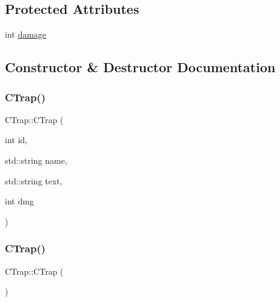 \subsection*{Protected Attributes}
\begin{DoxyCompactItemize}
\item 
int \mbox{\hyperlink{class_c_trap_a491913fea694bfc0cf03a41421073dea}{damage}}
\end{DoxyCompactItemize}


\subsection{Constructor \& Destructor Documentation}
\mbox{\label{class_c_trap_a25c6fff676697227814dd5fb5bfc6b9f}} 
\subsubsection{\texorpdfstring{C\+Trap()}{CTrap()}\hspace{0.1cm}{\footnotesize\ttfamily [1/2]}}
{\footnotesize\ttfamily C\+Trap\+::\+C\+Trap (\begin{DoxyParamCaption}\item[{int}]{id,  }\item[{std\+::string}]{name,  }\item[{std\+::string}]{text,  }\item[{int}]{dmg }\end{DoxyParamCaption})\hspace{0.3cm}{\ttfamily [inline]}}

\mbox{\label{class_c_trap_ae87432a113f52437d8f686f53fa0a36c}} 
\subsubsection{\texorpdfstring{C\+Trap()}{CTrap()}\hspace{0.1cm}{\footnotesize\ttfamily [2/2]}}
{\footnotesize\ttfamily C\+Trap\+::\+C\+Trap (\begin{DoxyParamCaption}{ }\end{DoxyParamCaption})\hspace{0.3cm}{\ttfamily [delete]}}



